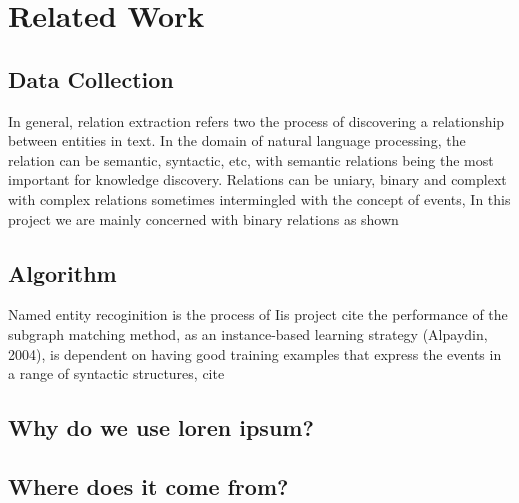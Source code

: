 \chapter{Related Work}  %

\ifpdf
    \graphicspath{{RelatedWork/Figs/Raster/}{RelatedWork/Figs/PDF/}{Introduction/Figs/}}
\else
    \graphicspath{{RelatedWork/Figs/Vector/}{RelatedWork/Figs/}}
\fi

\section{Data Collection} %
In general, relation extraction refers two the process of discovering a relationship between entities in text. In the domain of natural language processing, the relation can be semantic, syntactic, etc, with semantic relations being the most important for knowledge discovery. Relations can be uniary, binary and complext with complex relations sometimes intermingled with the concept of events, In this project we are mainly concerned with binary relations as shown

\section{Algorithm}
Named entity recoginition is the process of 
Iis project 
cite
the performance of the subgraph matching method, as an instance-based learning strategy (Alpaydin, 2004), is dependent on having good training examples that express the events in a range of syntactic structures, cite

\section{Why do we use loren ipsum?} %


\section{Where does it come from?}  %
\label{section1.3}
